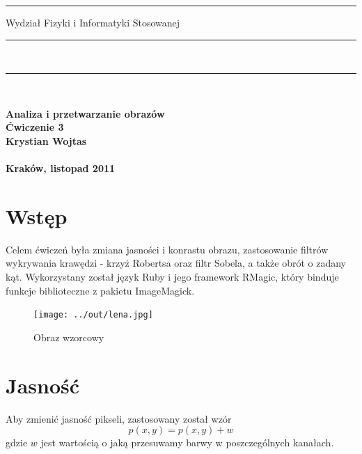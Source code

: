 \documentclass[a4paper,12pt]{article}
\begin{document}
\rule{26mm}{0pt}
{\large\textsf{Wydział Fizyki i Informatyki Stosowanej}}\\
\rule{\textwidth}{3pt}\\
\rule[2ex]
{\textwidth}{1pt}\\
\vspace{7ex}
\begin{center}
{\bf\LARGE\textsf{Analiza i przetwarzanie obrazów}}\\
\vspace{13ex}
{\bf\huge\textsf{Ćwiczenie 3}}\\
\vspace{3ex}
{\sf \small } {\bf\small\textsf{Krystian Wojtas}}\\
\vspace{14ex}
{\sf \Large } {\bf\Large\textsf{}}\\
\vspace{22ex}
\textsf{\bf\large\textsf{Kraków, listopad 2011}}
\end{center}


\newpage
\section{Wstęp}
Celem ćwiczeń była zmiana jasności i konrastu obrazu, zastosowanie filtrów wykrywania krawędzi - krzyż Robertsa oraz filtr Sobela, a także obrót o zadany kąt. Wykorzystany został język Ruby i jego framework RMagic, który binduje funkcje biblioteczne z pakietu ImageMagick.

\begin{figure}[h!]
   \centering
   \texttt{[image: ../out/lena.jpg]}
   \caption{Obraz wzorcowy}
\end{figure}


\newpage
\section{Jasność}
Aby zmienić jasność pikseli, zastosowany został wzór
$$p(x, y) = p(x, y) + w$$
gdzie $w$ jest wartością o jaką przesuwamy barwy w poszczególnych kanałach.


\end{document}
